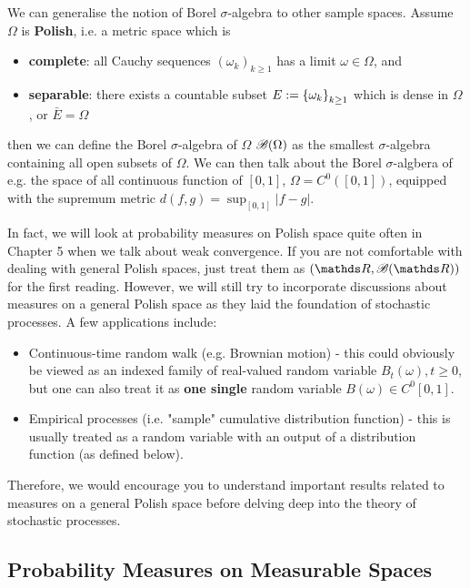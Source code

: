 \begin{unexaminable}
\begin{remark} \label{rmk:PolishSpace} We can generalise the notion of Borel $\sigma$-algebra to other sample spaces. Assume $\Omega$ is \textbf{Polish}, i.e. a metric space which is
\begin{itemize}
    \item \textbf{complete}: all Cauchy sequences $(\omega_k)_{k\geq 1}$ has a limit $\omega \in \Omega$, and 
    \item \textbf{separable}: there exists a countable subset $E :=  \left\{ \omega_k \right \}_{k\geq 1}$ which is dense in $\Omega$, or $\bar{E} = \Omega$
\end{itemize}
then we can define the Borel $\sigma$-algebra of $\Omega$ $\mathcal{B}(\Omega)$ as the smallest $\sigma$-algebra containing all open subsets of $\Omega$. We can then talk about the Borel $\sigma$-algbera of e.g. the space of all continuous function of $[0,1]$, $\Omega = C^0([0,1])$, equipped with the supremum metric $d(f,g) = \sup_{[0,1]} |f-g|$.
\end{remark}

In fact, we will look at probability measures on Polish space quite often in Chapter 5 when we talk about weak convergence. If you are not comfortable with dealing with general Polish spaces, just treat them as $(\R,\B(\R))$ for the first reading. However, we will still try to incorporate discussions about measures on a general Polish space as they laid the foundation of stochastic processes. A few applications include:
\begin{itemize}
\item Continuous-time random walk (e.g. Brownian motion) - this could obviously be viewed as an indexed family of real-valued random variable $B_t(\omega), t \geq 0$, but one can also treat it as \textbf{one single} random variable $B(\omega) \in C^0[0,1].$
\item Empirical processes (i.e. "sample" cumulative distribution function) - this is usually treated as a random variable with an output of a distribution function (as defined below).
\end{itemize}

Therefore, we would encourage you to understand important results related to measures on a general Polish space before delving deep into the theory of stochastic processes.
\end{unexaminable}

\subsection{Probability Measures on Measurable Spaces}
